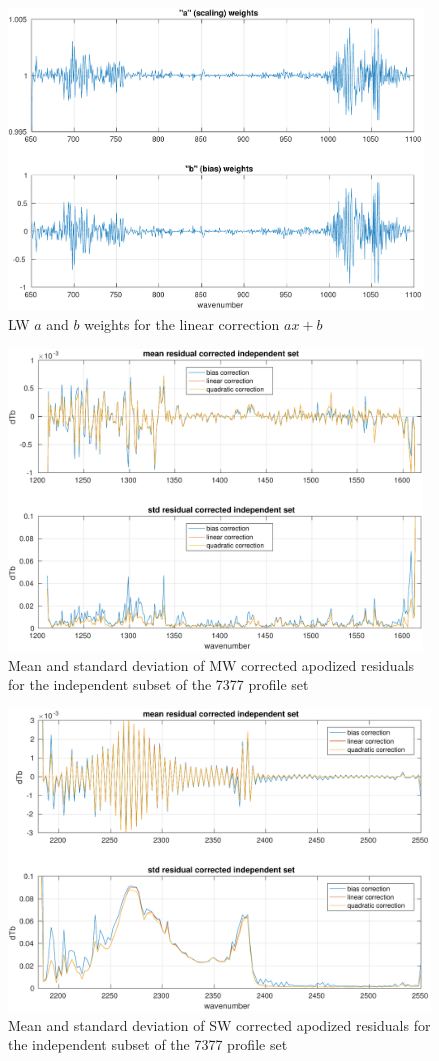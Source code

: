 \documentclass[12pt]{article}
\begin{document}
\begin{figure} %
  \centering
  \includegraphics[height=8cm]{figures/a2cris_coef_LW.pdf}
  \caption{LW $a$ and $b$ weights for the linear correction $ax+b$}
  \label{coefLW}
\end{figure}

\begin{figure} %
  \centering
  \includegraphics[height=8cm]{figures/a2cris_stat_MW.pdf}
  \caption{Mean and standard deviation of MW corrected apodized
    residuals for the independent subset of the 7377 profile set}
  \label{statMW}
\end{figure}

\begin{figure} %
  \centering
  \includegraphics[height=8cm]{figures/a2cris_stat_SW.pdf}
  \caption{Mean and standard deviation of SW corrected apodized
    residuals for the independent subset of the 7377 profile set}
  \label{statSW}
\end{figure}

\FloatBarrier


\end{document}
